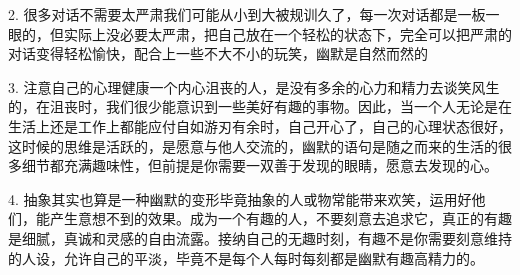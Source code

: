 \documentclass[a4paper]{article}
\begin{document}
2. 很多对话不需要太严肃我们可能从小到大被规训久了，每一次对话都是一板一眼的，但实际上没必要太严肃，把自己放在一个轻松的状态下，完全可以把严肃的对话变得轻松愉快，配合上一些不大不小的玩笑，幽默是自然而然的

3. 注意自己的心理健康一个内心沮丧的人，是没有多余的心力和精力去谈笑风生的，在沮丧时，我们很少能意识到一些美好有趣的事物。因此，当一个人无论是在生活上还是工作上都能应付自如游刃有余时，自己开心了，自己的心理状态很好，这时候的思维是活跃的，是愿意与他人交流的，幽默的语句是随之而来的生活的很多细节都充满趣味性，但前提是你需要一双善于发现的眼睛，愿意去发现的心。

4. 抽象其实也算是一种幽默的变形毕竟抽象的人或物常能带来欢笑，运用好他们，能产生意想不到的效果。成为一个有趣的人，不要刻意去追求它，真正的有趣是细腻，真诚和灵感的自由流露。接纳自己的无趣时刻，有趣不是你需要刻意维持的人设，允许自己的平淡，毕竟不是每个人每时每刻都是幽默有趣高精力的。
\end{document}
